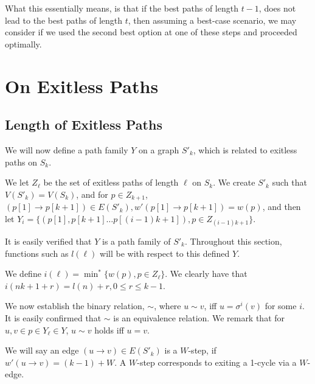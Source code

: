 \documentclass{article}
\newcommand{\edit}[1]{}%
\begin{document}
What this essentially means, is that if the best paths of length $t-1$, does not lead to the best paths of length $t$, then assuming a best-case scenario, we may consider if we used the second best option at one of these steps and proceeded optimally.\edit{ probably rewrite a reconsider where this is placed}

\section{On Exitless Paths} \label{bounding i}

\subsection{Length of Exitless Paths}

We will now define a path family $Y$ on a graph $S'_k$, which is related to exitless paths on $S_k$.

\vspace{1.75em}

We let $Z_\ell$ be the set of exitless paths of length $\ell$ on $S_k$. We create $S'_k$ such that $V(S'_k) = V(S_k)$, and for $p \in Z_{k+1}$, $(p[1]\to p[k+1]) \in E(S'_k), w'(p[1]\to p[k+1]) = w(p)$, and then let $Y_i = \{(p[1], p[k+1]\dots p[(i-1)k+1]), p \in Z_{(i-1)k+1}\}$.\edit{ dense/cluttered; technically already used $w'$ before}

It is easily verified that $Y$ is a path family of $S'_k$. Throughout this section, functions such as $l(\ell)$ will be with respect to this defined $Y$.\edit{ last sentence is pedantic and off-putting to me} 

\vspace{1.75em}

We define $i(\ell) = \min^* \{ w(p), p \in Z_{\ell}\}$. We clearly have that $i(nk+1 +r) = l(n)+r, 0 \leq r \leq k-1$. 

We now establish the binary relation, $\sim$, where $u \sim v$, iff $u = \sigma^i(v)$ for some $i$.\edit{ maybe should remark that this is a 1-cycle} It is easily confirmed that $\sim$ is an equivalence relation. We remark that for $u,v \in p \in Y_\ell \in Y$, $u\sim v$ holds iff $u = v$.\edit{ I wanna just write $p \in Y$, maybe reconsider notation of path families, or establish this as an abuse of notation}

We will say an edge $(u\to v) \in E(S'_k)$ is a $W$-step, if $w'(u\to v) = (k-1)+W$. A $W$-step corresponds to exiting a 1-cycle via a $W$-edge.\edit{ have not defined 1-cycles} 
\end{document}
